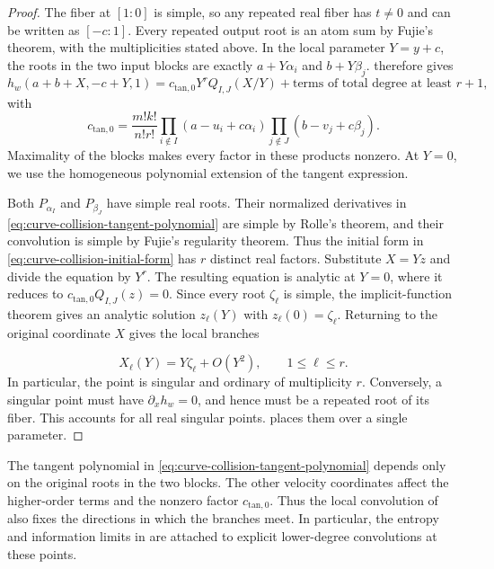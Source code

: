 \documentclass[12pt,reqno]{amsart}
\theoremstyle{definition}
\theoremstyle{remark}
\begin{document}
\begin{proof}
The fiber at \([1:0]\) is simple, so any repeated real fiber has
\(t\ne0\) and can be written as \([-c:1]\).  Every repeated output
root is an atom sum by Fujie's theorem, with the multiplicities stated
above.  In the local parameter \(Y=y+c\), the roots in the two input
blocks are exactly \(a+Y\alpha_i\) and \(b+Y\beta_j\).
 therefore gives
\begin{equation}\label{eq:curve-collision-initial-form}
 h_w(a+b+X,-c+Y,1)
 =c_{\mathrm{tan},0}Y^rQ_{I,J}(X/Y)
   +\text{terms of total degree at least }r+1,
\end{equation}
with
\begin{equation}\label{eq:curve-collision-leading-constant}
 c_{\mathrm{tan},0}=\frac{m!k!}{n!r!}
 \prod_{i\notin I}(a-u_i+c\alpha_i)
 \prod_{j\notin J}(b-v_j+c\beta_j).
\end{equation}
Maximality of the blocks makes every factor in these products nonzero.
At \(Y=0\), we use the homogeneous polynomial extension of the
tangent expression.

Both \(P_{\alpha_I}\) and \(P_{\beta_J}\) have simple real roots.
Their normalized derivatives in
\eqref{eq:curve-collision-tangent-polynomial} are simple by Rolle's
theorem, and their convolution is simple by Fujie's regularity theorem.
Thus the initial form in \eqref{eq:curve-collision-initial-form} has
\(r\) distinct real factors. Substitute \(X=Yz\) and divide the equation by \(Y^r\). The resulting equation is analytic at \(Y=0\), where it reduces to \(c_{\mathrm{tan},0}Q_{I,J}(z)=0\). Since every root \(\zeta_\ell\) is simple, the implicit-function theorem gives an analytic solution \(z_\ell(Y)\) with \(z_\ell(0)=\zeta_\ell\). Returning to the original coordinate \(X\) gives the local branches

\begin{equation}\label{eq:ordinary-collision-branches}
 X_\ell(Y)=Y\zeta_\ell+O(Y^2),\qquad 1\leq\ell\leq r.
\end{equation}
In particular, the point is singular and ordinary of multiplicity \(r\). Conversely, a singular point must have \(\partial_xh_w=0\), and hence
must be a repeated root of its fiber.  This accounts for all real
singular points.  places them over
a single parameter. 
\end{proof}

The tangent polynomial in \eqref{eq:curve-collision-tangent-polynomial} depends only on the original roots in the two blocks.  The other velocity coordinates affect the higher-order terms and the nonzero factor \(c_{\mathrm{tan},0}\). Thus the local convolution of  also fixes the directions in which the branches meet.  In particular, the entropy and information limits in  are attached to explicit lower-degree convolutions at these points.
\end{document}
